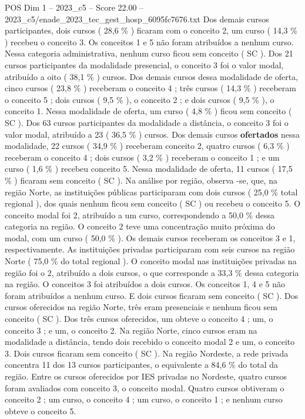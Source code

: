 \begin{textsample}{POS Dim 1 – 2023\_c5 – Score 22.00 – 2023\_c5/enade\_2023\_tec\_gest\_hosp\_6095fc7676.txt}
Dos demais cursos participantes, dois cursos ( 28,6 \% ) ficaram com o conceito 2, um curso ( 14,3 \% ) recebeu o conceito 3.
Os conceitos 1 e 5 não foram atribuídos a nenhum curso.
Nessa categoria administrativa, nenhum curso ficou sem conceito ( SC ).
Dos 21 cursos participantes da modalidade presencial, o conceito 3 foi o valor modal, atribuído a oito ( 38,1 \% ) cursos.
Dos demais cursos dessa modalidade de oferta, cinco cursos ( 23,8 \% ) receberam o conceito 4 ; três cursos ( 14,3 \% ) receberam o conceito 5 ; dois cursos ( 9,5 \% ), o conceito 2 ; e dois cursos ( 9,5 \% ), o conceito 1.
Nessa modalidade de oferta, um curso ( 4,8 \% ) ficou sem conceito ( SC ).
Dos 63 cursos participantes da modalidade a distância, o conceito 3 foi o valor modal, atribuído a 23 ( 36,5 \% ) cursos.
Dos demais cursos \textbf{ofertados} nessa modalidade, 22 cursos ( 34,9 \% ) receberam conceito 2, quatro cursos ( 6,3 \% ) receberam o conceito 4 ; dois cursos ( 3,2 \% ) receberam o conceito 1 ; e um curso ( 1,6 \% ) recebeu conceito 5.
Nessa modalidade de oferta, 11 cursos ( 17,5 \% ) ficaram sem conceito ( SC ).
Na análise por região, observa -se, que, na região Norte, as instituições públicas participaram com dois cursos ( 25,0 \% total regional ), dos quais nenhum ficou sem conceito ( SC ) ou recebeu o conceito 5.
O conceito modal foi 2, atribuído a um curso, correspondendo a 50,0 \% dessa categoria na região.
O conceito 2 teve uma concentração muito próxima do modal, com um curso ( 50,0 \% ).
Os demais cursos receberam os conceitos 3 e 1, respectivamente.
As instituições privadas participaram com seis cursos na região Norte ( 75,0 \% do total regional ).
O conceito modal nas instituições privadas na região foi o 2, atribuído a dois cursos, o que corresponde a 33,3 \% dessa categoria na região.
O conceitos 3 foi atribuídos a dois cursos.
Os conceitos 1, 4 e 5 não foram atribuídos a nenhum curso.
E dois cursos ficaram sem conceito ( SC ).
Dos cursos oferecidos na região Norte, três eram presenciais e nenhum ficou sem conceito ( SC ).
Dos três cursos oferecidos, um obteve o conceito 4 ; um, o conceito 3 ; e um, o conceito 2.
Na região Norte, cinco cursos eram na modalidade a distância, tendo dois recebido o conceito modal 2 e um, o conceito 3.
Dois cursos ficaram sem conceito ( SC ).
Na região Nordeste, a rede privada concentra 11 dos 13 cursos participantes, o equivalente a 84,6 \% do total da região.
Entre os cursos oferecidos por IES privadas no Nordeste, quatro cursos foram avaliados com conceito 3, o conceito modal.
Quatro cursos obtiveram o conceito 2 ; um curso, o conceito 4 ; um curso, o conceito 1 ; e nenhum curso obteve o conceito 5.

\end{textsample}
